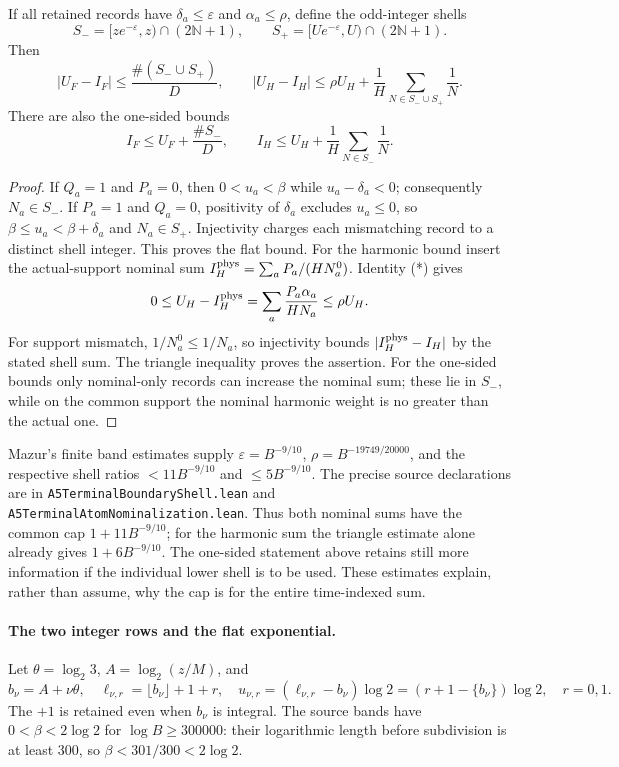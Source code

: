 \begin{proposition}
\label{prop:Mazur-boundaries}
If all retained records have $\delta_a\le\varepsilon$ and
$\alpha_a\le\rho$, define the odd-integer shells
\[
 S_-=[ze^{-\varepsilon},z)\cap(2\mathbb N+1),\qquad
 S_+=[Ue^{-\varepsilon},U)\cap(2\mathbb N+1).
\]
Then
\[
 |U_F-I_F|\le\frac{\#(S_-\cup S_+)}D,\qquad
 |U_H-I_H|\le\rho U_H+
       \frac1H\sum_{N\in S_-\cup S_+}\frac1N.
 \label{eq:Mazur-shell-bounds}
\]
There are also the one-sided bounds
\[
 I_F\le U_F+\frac{\#S_-}{D},\qquad
 I_H\le U_H+\frac1H\sum_{N\in S_-}\frac1N.
\]
\end{proposition}
\begin{proof}
If $Q_a=1$ and $P_a=0$, then $0<u_a<\beta$ while
$u_a-\delta_a<0$; consequently $N_a\in S_-$.
If $P_a=1$ and $Q_a=0$, positivity of $\delta_a$ excludes
$u_a\le0$, so $\beta\le u_a<\beta+\delta_a$ and
$N_a\in S_+$. Injectivity charges each mismatching record to
a distinct shell integer. This proves the flat bound.
For the harmonic bound insert the actual-support nominal sum
$I_H^{\rm phys}=\sum_a P_a/(HN_a^0)$. Identity (*) gives
\[
 0\le U_H-I_H^{\rm phys}
       =\sum_a\frac{P_a\alpha_a}{HN_a}\le\rho U_H.
\]
For support mismatch, $1/N_a^0\le1/N_a$, so injectivity
bounds $|I_H^{\rm phys}-I_H|$ by the stated shell sum.
The triangle inequality proves the assertion.
For the one-sided bounds only nominal-only records can increase
the nominal sum; these lie in $S_-$, while on the common support
the nominal harmonic weight is no greater than the actual one.
\end{proof}

Mazur's finite band estimates supply
$\varepsilon=B^{-9/10}$, $\rho=B^{-19749/20000}$, and the
respective shell ratios $<11B^{-9/10}$ and $\le5B^{-9/10}$.
The precise source declarations are in
\texttt{A5TerminalBoundaryShell.lean} and
\texttt{A5TerminalAtomNominalization.lean}.
Thus both nominal sums have the common cap $1+11B^{-9/10}$;
for the harmonic sum the triangle estimate alone already gives
$1+6B^{-9/10}$. The one-sided statement above retains still more
information if the individual lower shell is to be used.
These estimates explain, rather than assume, why the cap is for
the entire time-indexed sum.

\paragraph{The two integer rows and the flat exponential.}
Let $\theta=\log_2 3$, $A=\log_2(z/M)$, and
\[
 b_\nu=A+\nu\theta,\quad
 \ell_{\nu,r}=\lfloor b_\nu\rfloor+1+r,\quad
 u_{\nu,r}=(\ell_{\nu,r}-b_\nu)\log2
             =(r+1-\{b_\nu\})\log2,\quad r=0,1.
\]
The $+1$ is retained even when $b_\nu$ is integral.
The source bands have $0<\beta<2\log2$ for $\log B\ge300000$:
their logarithmic length before subdivision is at least $300$,
so $\beta<301/300<2\log2$.


